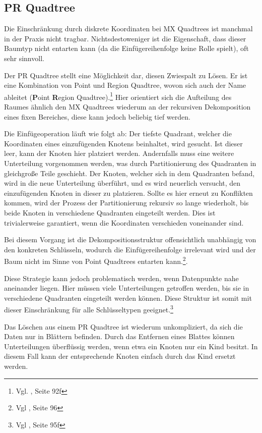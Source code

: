 \documentclass[%
			fontsize=12pt,%
			paper=a4,%
			DIV11,
			liststotoc,
			bibtotoc,
			draft=false,%
			titlepage
			]{scrartcl}
\newcommand{\zit}[3]{#1 \cite{#2}, #3}
\newcommand{\footzit}[3]{\footnote{\zit{#1}{#2}{#3}}}
\begin{document}
\subsection{PR Quadtree}

Die Einschränkung durch diskrete Koordinaten bei MX Quadtrees ist manchmal in der Praxis nicht tragbar.
Nichtsdestoweniger ist die Eigenschaft, dass dieser Baumtyp nicht entarten kann (da die Einfügereihenfolge keine Rolle spielt), oft sehr sinnvoll. 

Der PR Quadtree stellt eine Möglichkeit dar, diesen Zwiespalt zu Lösen. 
Er ist eine Kombination von Point und Region Quadtree, wovon sich auch der Name ableitet (\textbf{P}oint \textbf{R}egion Quadtree).\footzit{Vgl.}{Samet90}{Seite 92f}
Hier orientiert sich die Aufteilung des Raumes ähnlich den MX Quadtrees wiederum an der rekursiven Dekomposition eines fixen Bereiches, diese kann jedoch beliebig tief werden.

Die Einfügeoperation läuft wie folgt ab:
Der tiefste Quadrant, welcher die Koordinaten eines einzufügenden Knotens beinhaltet, wird gesucht.
Ist dieser leer, kann der Knoten hier platziert werden.
Andernfalls muss eine weitere Unterteilung vorgenommen werden, was durch Partitionierung des Quadranten in gleichgroße Teile geschieht. 
Der Knoten, welcher sich in dem Quadranten befand, wird in die neue Unterteilung überführt, und es wird neuerlich versucht, den einzufügenden Knoten in dieser zu platzieren. 
Sollte es hier erneut zu Konflikten kommen, wird der Prozess der Partitionierung rekursiv so lange wiederholt, bis beide Knoten in verschiedene Quadranten eingeteilt werden.
Dies ist trivialerweise garantiert, wenn die Koordinaten verschieden voneinander sind.

Bei diesem Vorgang ist die Dekompositionsstruktur offensichtlich unabhängig von den konkreten Schlüsseln, wodurch die Einfügereihenfolge irrelevant wird und der Baum nicht im Sinne von Point Quadtrees entarten kann.\footzit{Vgl}{Samet90}{Seite 96}.

Diese Strategie kann jedoch problematisch werden, wenn Datenpunkte nahe aneinander liegen.
Hier müssen viele Unterteilungen getroffen werden, bis sie in verschiedene Quadranten eingeteilt werden können. 
Diese Struktur ist somit mit dieser Einschränkung für alle Schlüsseltypen geeignet.\footzit{Vgl}{Samet90}{Seite 95f}

Das Löschen aus einem PR Quadtree ist wiederum unkompliziert, da sich die Daten nur in Blättern befinden.
Durch das Entfernen eines Blattes können Unterteilungen überflüssig werden, wenn etwa ein Knoten nur ein Kind besitzt.
In diesem Fall kann der entsprechende Knoten einfach durch das Kind ersetzt werden.
\end{document}
